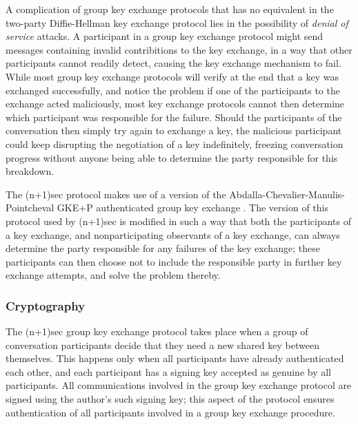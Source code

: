 \documentclass{article}
\begin{document}
A complication of group key exchange protocols that has no equivalent in the two-party Diffie-Hellman key exchange protocol lies in the possibility of \emph{denial of service} attacks.
A participant in a group key exchange protocol might send messages containing invalid contribitions to the key exchange, in a way that other participants cannot readily detect, causing the key exchange mechanism to fail.
While most group key exchange protocols will verify at the end that a key was exchanged successfully, and notice the problem if one of the participants to the exchange acted maliciously, most key exchange protocols cannot then determine which participant was responsible for the failure.
Should the participants of the conversation then simply try again to exchange a key, the malicious participant could keep disrupting the negotiation of a key indefinitely, freezing conversation progress without anyone being able to determine the party responsible for this breakdown.

The (n+1)sec protocol makes use of a version of the Abdalla-Chevalier-Manulis-Pointcheval GKE+P authenticated group key exchange \cite{acmp}.
The version of this protocol used by (n+1)sec is modified in such a way that both the participants of a key exchange, and nonparticipating observants of a key exchange, can always determine the party responsible for any failures of the key exchange; these participants can then choose not to include the responsible party in further key exchange attempts, and solve the problem thereby.

\subsubsection{Cryptography}
\label{sec:cryptography/group-key-exchange/cryptography}

The (n+1)sec group key exchange protocol takes place when a group of conversation participants decide that they need a new shared key between themselves.
This happens only when all participants have already authenticated each other, and each participant has a signing key accepted as genuine by all participants.
All communications involved in the group key exchange protocol are signed using the author's such signing key; this aspect of the protocol ensures authentication of all participants involved in a group key exchange procedure.
\end{document}
